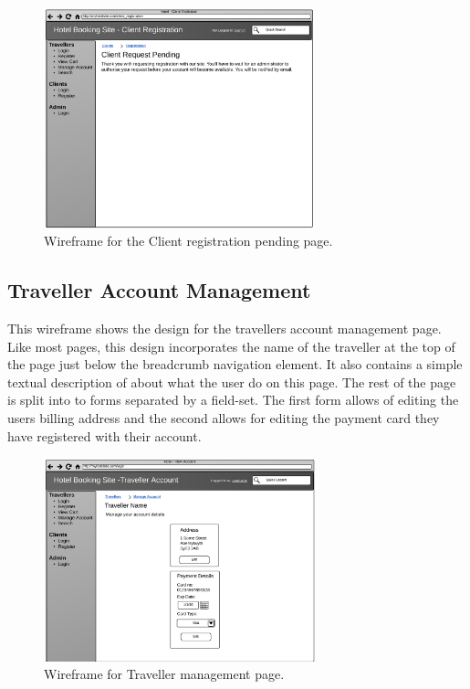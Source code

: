 \documentclass{article}
\begin{document}
\begin{figure}[H]
\centering
\includegraphics[width=0.7\textwidth]{img/wireframes/ClientPending.png}
\caption{Wireframe for the Client registration pending page.}
\label{fig:wireframe-client-pending}
\end{figure}

\subsection{Traveller Account Management}
This wireframe shows the design for the travellers account management page. Like most pages, this design incorporates the name of the traveller at the top of the page just below the breadcrumb navigation element. It also contains a simple textual description of about what the user do on this page. The rest of the page is split into to forms separated by a field-set. The first form allows of editing the users billing address and the second allows for editing the payment card they have registered with their account.

\begin{figure}[H]
\centering
\includegraphics[width=0.7\textwidth]{img/wireframes/TravellerAccount.png}
\caption{Wireframe for Traveller management page.}
\label{fig:wireframe-client-register}
\end{figure}
\end{document}
